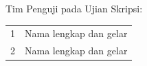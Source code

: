 
\clearpage
\thispagestyle{empty}

\vspace*{\fill}

\noindent
Tim Penguji pada Ujian Skripsi:

\noindent
\begin{tabular}{@{}ll@{}}
\hspace{1.5cm}1 & Nama lengkap dan gelar \\[1\baselineskip]
\hspace{1.5cm}2 & Nama lengkap dan gelar \\[1\baselineskip]
\end{tabular}


\cleardoublepage
